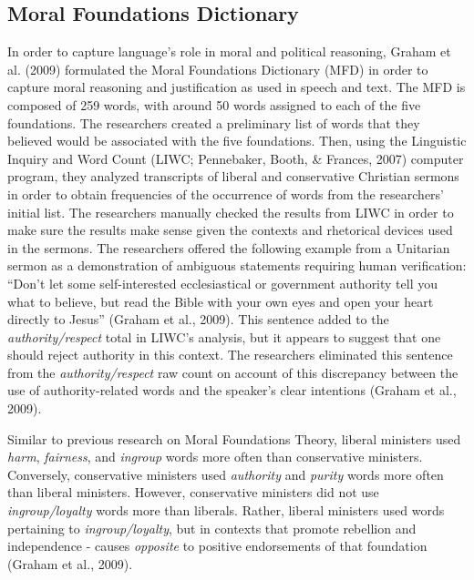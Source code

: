 \documentclass[,man]{apa6}
\begin{document}
\hypertarget{moral-foundations-dictionary}{%
\subsection{Moral Foundations Dictionary}\label{moral-foundations-dictionary}}

In order to capture language's role in moral and political reasoning, Graham et al. (2009) formulated the Moral Foundations Dictionary (MFD) in order to capture moral reasoning and justification as used in speech and text. The MFD is composed of 259 words, with around 50 words assigned to each of the five foundations. The researchers created a preliminary list of words that they believed would be associated with the five foundations. Then, using the Linguistic Inquiry and Word Count (LIWC; Pennebaker, Booth, \& Frances, 2007) computer program, they analyzed transcripts of liberal and conservative Christian sermons in order to obtain frequencies of the occurrence of words from the researchers' initial list. The researchers manually checked the results from LIWC in order to make sure the results make sense given the contexts and rhetorical devices used in the sermons. The researchers offered the following example from a Unitarian sermon as a demonstration of ambiguous statements requiring human verification: \enquote{Don't let some self-interested ecclesiastical or government authority tell you what to believe, but read the Bible with your own eyes and open your heart directly to Jesus} (Graham et al., 2009). This sentence added to the \emph{authority/respect} total in LIWC's analysis, but it appears to suggest that one should reject authority in this context. The researchers eliminated this sentence from the \emph{authority/respect} raw count on account of this discrepancy between the use of authority-related words and the speaker's clear intentions (Graham et al., 2009).

Similar to previous research on Moral Foundations Theory, liberal ministers used \emph{harm}, \emph{fairness}, and \emph{ingroup} words more often than conservative ministers. Conversely, conservative ministers used \emph{authority} and \emph{purity} words more often than liberal ministers. However, conservative ministers did not use \emph{ingroup/loyalty} words more than liberals. Rather, liberal ministers used words pertaining to \emph{ingroup/loyalty}, but in contexts that promote rebellion and independence - causes \emph{opposite} to positive endorsements of that foundation (Graham et al., 2009).
\end{document}

